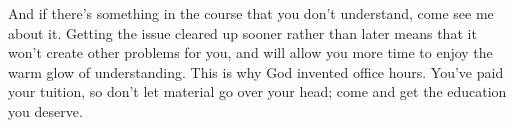 \documentclass{tufte-handout}
\begin{document}

And if there's something in the course that you don't understand, come
see me about it. Getting the issue cleared up sooner rather than later
means that it won't create other problems for you, and will allow you
more time to enjoy the warm glow of understanding. This is why God
invented office hours. You've paid your tuition, so don't let material
go over your head; come and get the education you deserve.

    
\end{document}
